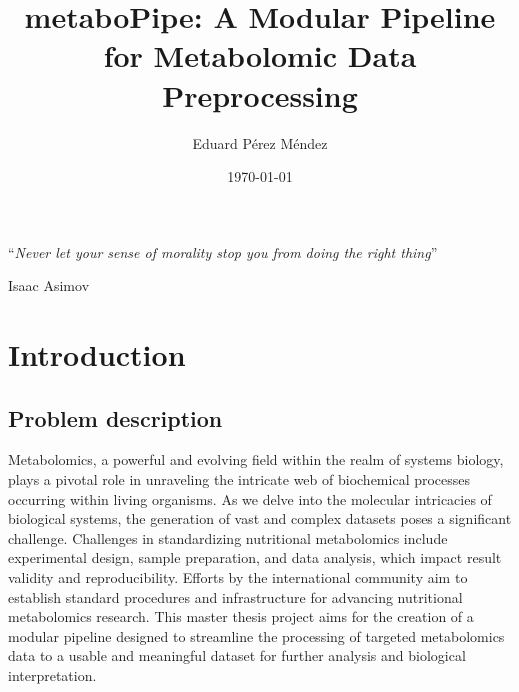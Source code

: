 \documentclass[ENG, BIB]{TFUOC}%
\title{metaboPipe: A Modular Pipeline for Metabolomic Data Preprocessing}
\author{Eduard Pérez Méndez}
\date{\today}
\begin{document}
\estructura

\newpage\null\thispagestyle{empty}

\vspace*{0.4\textheight}

\noindent\enquote{\itshape Never let your sense of morality stop you from doing the right thing}\bigbreak




\hfill Isaac Asimov

\newpage


\tableofcontents

\listoffigures

\listoftables



\chapter{Introduction}

\section{Problem description}

Metabolomics, a powerful and evolving field within the realm of systems biology, plays a pivotal role in unraveling the intricate web of biochemical processes occurring within living organisms. As we delve into the molecular intricacies of biological systems, the generation of vast and complex datasets poses a significant challenge. Challenges in standardizing nutritional metabolomics include experimental design, sample preparation, and data analysis, which impact result validity and reproducibility. Efforts by the international community aim to establish standard procedures and infrastructure for advancing nutritional metabolomics research. This master thesis project aims for the creation of a modular pipeline designed to streamline the processing of targeted metabolomics data to a usable and meaningful dataset for further analysis and biological interpretation.
\end{document}
